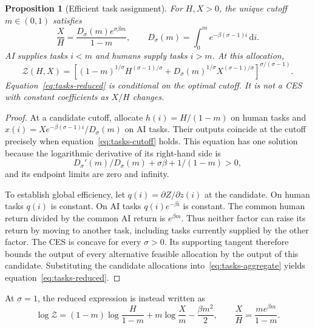 \documentclass[11pt]{article}
\newtheorem{proposition}{Proposition}
\newcommand{\dd}{\,\mathrm d}
\begin{document}
\begin{proposition}[Efficient task assignment]
For $H,X>0$, the unique cutoff $m\in(0,1)$ satisfies
\begin{equation}
 \frac XH=\frac{D_\sigma(m)e^{\sigma\beta m}}{1-m},\qquad
 D_\sigma(m)=\int_0^m e^{-\beta(\sigma-1)i}\dd i.
 \label{eq:tasks-cutoff}
\end{equation}
AI supplies tasks $i<m$ and humans supply tasks $i>m$. At this allocation,
\begin{equation}
 \mathcal Z(H,X)=
 \left[(1-m)^{1/\sigma}H^{(\sigma-1)/\sigma}
       +D_\sigma(m)^{1/\sigma}X^{(\sigma-1)/\sigma}
 \right]^{\sigma/(\sigma-1)}.
 \label{eq:tasks-reduced}
\end{equation}
Equation~\eqref{eq:tasks-reduced} is conditional on the optimal cutoff.
It is not a CES with constant coefficients as $X/H$ changes.
\end{proposition}
\begin{proof}
At a candidate cutoff, allocate $h(i)=H/(1-m)$ on human tasks and
$x(i)=X e^{-\beta(\sigma-1)i}/D_\sigma(m)$ on AI tasks.
Their outputs coincide at the cutoff precisely when
equation~\eqref{eq:tasks-cutoff} holds. This equation has one solution because
the logarithmic derivative of its right-hand side is
\[
 D_\sigma'(m)/D_\sigma(m)+\sigma\beta+1/(1-m)>0,
\]
and its endpoint limits are zero and infinity.

To establish global efficiency, let $q(i)=\partial Z/\partial z(i)$ at the candidate.
On human tasks $q(i)$ is constant. On AI tasks $q(i)e^{-\beta i}$ is constant.
The common human return divided by the common AI return is $e^{\beta m}$.
Thus neither factor can raise its return by moving to another task, including
tasks currently supplied by the other factor. The CES is concave for every
$\sigma>0$. Its supporting tangent therefore bounds the output of every
alternative feasible allocation by the output of this candidate.
Substituting the candidate allocations into~\eqref{eq:tasks-aggregate} yields
equation~\eqref{eq:tasks-reduced}.
\end{proof}

At $\sigma=1$, the reduced expression is instead written as
\begin{equation}
 \log\mathcal Z=(1-m)\log\frac{H}{1-m}
     +m\log\frac Xm-\frac{\beta m^2}{2},\qquad
 \frac XH=\frac{m e^{\beta m}}{1-m}.
 \label{eq:tasks-unit}
\end{equation}
\end{document}
